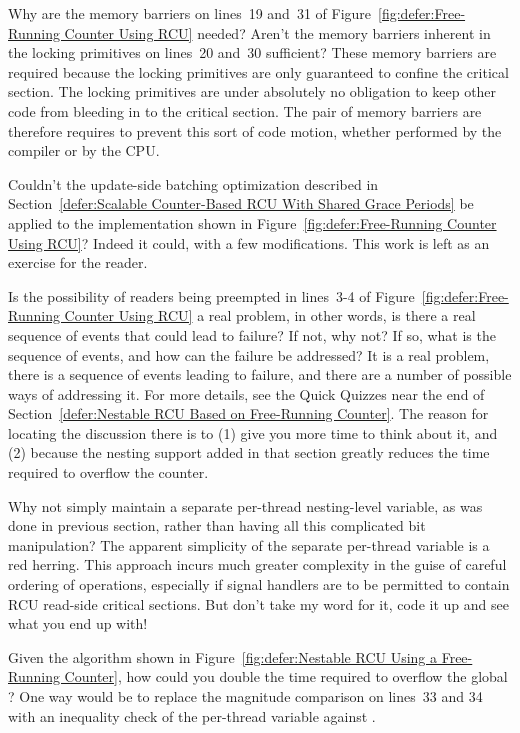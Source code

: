 \QuickQ{}
	Why are the memory barriers on lines~19 and~31 of
	Figure~\ref{fig:defer:Free-Running Counter Using RCU}
	needed?
	Aren't the memory barriers inherent in the locking
	primitives on lines~20 and~30 sufficient?
\QuickA{}
	These memory barriers are required because the locking
	primitives are only guaranteed to confine the critical
	section.
	The locking primitives are under absolutely no obligation
	to keep other code from bleeding in to the critical section.
	The pair of memory barriers are therefore requires to prevent
	this sort of code motion, whether performed by the compiler
	or by the CPU.

\QuickQ{}
	Couldn't the update-side batching optimization described in
	Section~\ref{defer:Scalable Counter-Based RCU With Shared Grace Periods}
	be applied to the implementation shown in
	Figure~\ref{fig:defer:Free-Running Counter Using RCU}?
\QuickA{}
	Indeed it could, with a few modifications.
	This work is left as an exercise for the reader.

\QuickQ{}
	Is the possibility of readers being preempted in
	lines~3-4 of Figure~\ref{fig:defer:Free-Running Counter Using RCU}
	a real problem, in other words, is there a real sequence
	of events that could lead to failure?
	If not, why not?
	If so, what is the sequence of events, and how can the
	failure be addressed?
\QuickA{}
	It is a real problem, there is a sequence of events leading to
	failure, and there are a number of possible ways of
	addressing it.
	For more details, see the Quick Quizzes near the end of
	Section~\ref{defer:Nestable RCU Based on Free-Running Counter}.
	The reason for locating the discussion there is to (1) give you
	more time to think about it, and (2) because the nesting support
	added in that section greatly reduces the time required to
	overflow the counter.

\QuickQ{}
	Why not simply maintain a separate per-thread nesting-level
	variable, as was done in previous section, rather than having
	all this complicated bit manipulation?
\QuickA{}
	The apparent simplicity of the separate per-thread variable
	is a red herring.
	This approach incurs much greater complexity in the guise
	of careful ordering of operations, especially if signal
	handlers are to be permitted to contain RCU read-side
	critical sections.
	But don't take my word for it, code it up and see what you
	end up with!

\QuickQ{}
	Given the algorithm shown in
	Figure~\ref{fig:defer:Nestable RCU Using a Free-Running Counter},
	how could you double the time required to overflow the global
	?
\QuickA{}
	One way would be to replace the magnitude comparison on
	lines~33 and 34 with an inequality check of the per-thread
	 variable against
	.

